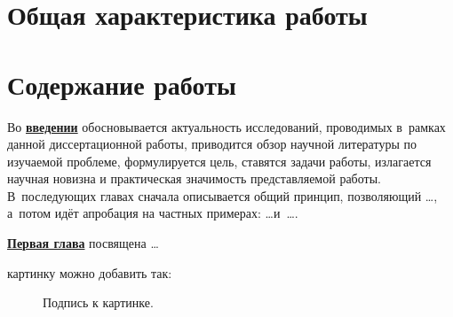 
\section*{Общая характеристика работы}

\newcommand{\actuality}{\underline{\textbf{\actualityTXT}}}
\newcommand{\progress}{\underline{\textbf{\progressTXT}}}
\newcommand{\aim}{\underline{{\textbf\aimTXT}}}
\newcommand{\tasks}{\underline{\textbf{\tasksTXT}}}
\newcommand{\novelty}{\underline{\textbf{\noveltyTXT}}}
\newcommand{\influence}{\underline{\textbf{\influenceTXT}}}
\newcommand{\methods}{\underline{\textbf{\methodsTXT}}}
\newcommand{\defpositions}{\underline{\textbf{\defpositionsTXT}}}
\newcommand{\reliability}{\underline{\textbf{\reliabilityTXT}}}
\newcommand{\probation}{\underline{\textbf{\probationTXT}}}
\newcommand{\contribution}{\underline{\textbf{\contributionTXT}}}
\newcommand{\publications}{\underline{\textbf{\publicationsTXT}}}




\section*{Содержание работы}
Во \underline{\textbf{введении}} обосновывается актуальность
исследований, проводимых в~рамках данной диссертационной работы,
приводится обзор научной литературы по изучаемой проблеме,
формулируется цель, ставятся задачи работы, излагается научная новизна
и практическая значимость представляемой работы. В~последующих главах
сначала описывается общий принцип, позволяющий \dots, а~потом идёт
апробация на частных примерах: \dots  и~\dots.


\underline{\textbf{Первая глава}} посвящена \dots

 картинку можно добавить так:
\begin{figure}[ht]
  \caption{Подпись к картинке.}\label{fig:latex}
\end{figure}

